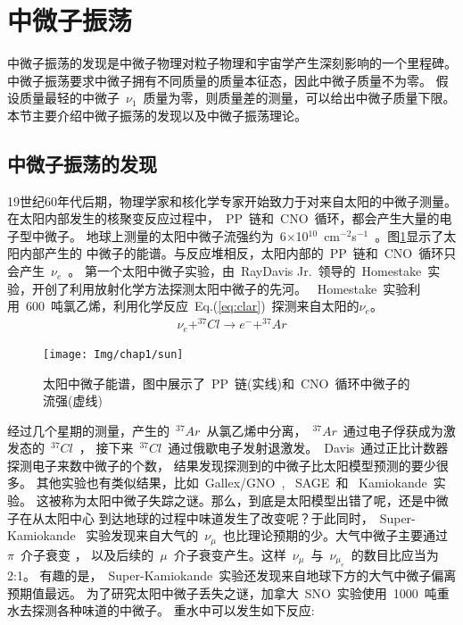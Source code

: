 \section{中微子振荡}
中微子振荡的发现是中微子物理对粒子物理和宇宙学产生深刻影响的一个里程碑。
中微子振荡要求中微子拥有不同质量的质量本征态，因此中微子质量不为零。
假设质量最轻的中微子~$\nu_1$~质量为零，则质量差的测量，可以给出中微子质量下限。
本节主要介绍中微子振荡的发现以及中微子振荡理论。
\subsection{中微子振荡的发现}
19世纪60年代后期，物理学家和核化学专家开始致力于对来自太阳的中微子测量。
在太阳内部发生的核聚变反应过程中，~PP~链和~CNO~循环，都会产生大量的电子型中微子\citep{bahcall2005new}。
地球上测量的太阳中微子流强约为~6$\times$10$^{10}$~cm$^{-2}$s$^{-1}$~。图\ref{fig:sun}显示了太阳内部产生的
中微子的能谱。与反应堆相反，太阳内部的~PP~链和~CNO~循环只会产生~$\nu_e$~。
第一个太阳中微子实验，由~RayDavis Jr.~领导的~Homestake~实验，开创了利用放射化学方法探测太阳中微子的先河。
~Homestake~实验利用~600~吨氯乙烯，利用化学反应~Eq.(\ref{eq:clar})~探测来自太阳的$\nu_e$。
\begin{eqnarray}\label{eq:clar}
\nu_e + ^{37}Cl \rightarrow e^- + ^{37}Ar
\end{eqnarray}
\begin{figure}[!htbp]
  \centering
   \texttt{[image: Img/chap1/sun]}
    \caption{太阳中微子能谱，图中展示了~PP~链(实线)和~CNO~循环中微子的流强(虚线)}
  \label{fig:sun}
\end{figure}
经过几个星期的测量，产生的~$^{37}Ar$~从氯乙烯中分离，~$^{37}Ar$~通过电子俘获成为激发态的~$^{37}Cl$~，
接下来~$^{37}Cl$~通过俄歇电子发射退激发。~Davis~通过正比计数器探测电子来数中微子的个数，
结果发现探测到的中微子比太阳模型预测的要少很多。
其他实验也有类似结果，比如~Gallex/GNO~, ~SAGE~\citep{abdurashitov1994results}和
~Kamiokande~\citep{PhysRevLett.63.16,PhysRevD.44.2241}实验。
这被称为太阳中微子失踪之谜。那么，到底是太阳模型出错了呢，还是中微子在从太阳中心
到达地球的过程中味道发生了改变呢？于此同时，~Super-Kamiokande~\citep{fukuda1998measurement}
实验发现来自大气的~$\nu_{\mu}$~也比理论预期的少。大气中微子主要通过~$\pi$~介子衰变 ，
以及后续的~$\mu$~介子衰变产生。这样~$\nu_{\mu}$~与~$\nu_{\mu_e}$~的数目比应当为2:1。
有趣的是，~Super-Kamiokande~实验还发现来自地球下方的大气中微子偏离预期值最远\citep{PhysRevLett.82.2644}。
为了研究太阳中微子丢失之谜，加拿大~SNO~实验\citep{mcdonald1999sudbury}使用~1000~吨重水去探测各种味道的中微子。
重水中可以发生如下反应:
